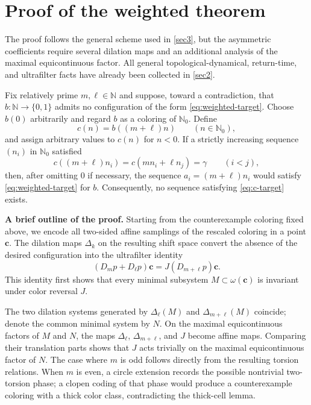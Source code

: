 \documentclass[reqno,12pt]{amsart}
\newcommand{\Nzero}{\mathbb N_0}
\def \N {\mathbb N}
\numberwithin{equation}{section}
\begin{document}
\section{Proof of the weighted theorem}\label{sec4}

The proof follows the general scheme used in \cref{sec3}, but the
asymmetric coefficients require several dilation maps and an additional
analysis of the maximal equicontinuous factor.  All general
topological-dynamical, return-time, and ultrafilter facts have already
been collected in \cref{sec2}.

Fix relatively prime $m,\ell\in\N$ and suppose, toward a contradiction, that
$b:\N\to\{0,1\}$ admits no configuration of the form
\eqref{eq:weighted-target}. Choose $b(0)$ arbitrarily and regard $b$ as a
coloring of $\Nzero$. Define
\[
 c(n)=b((m+\ell)n)\qquad(n\in\Nzero),
\]
and assign arbitrary values to $c(n)$ for $n<0$. If a strictly increasing
sequence $(n_i)$ in $\Nzero$ satisfied
\begin{equation}\label{eq:c-target}
 c((m+\ell)n_i)=c(mn_i+\ell n_j)=\gamma\qquad(i<j),
\end{equation}
then, after omitting $0$ if necessary, the sequence
$a_i=(m+\ell)n_i$ would satisfy \eqref{eq:weighted-target} for $b$.
Consequently, no sequence satisfying \eqref{eq:c-target} exists.

\noindent\textbf{A brief outline of the proof.}\enspace
Starting from the counterexample coloring fixed above, we encode all
two-sided affine samplings of the rescaled coloring
in a point $\mathbf c$.  The dilation maps $\Delta_k$ on the resulting
shift space convert the absence of the desired configuration into the
ultrafilter identity
\[
 (D_mp+D_\ell p)\mathbf c
 =J(D_{m+\ell}p)\mathbf c.
\]
This identity first shows that every minimal subsystem
$M\subset\omega(\mathbf c)$ is invariant under color reversal $J$.

The two dilation systems generated by $\Delta_\ell(M)$ and
$\Delta_{m+\ell}(M)$ coincide; denote the common minimal system by $N$.
On the maximal equicontinuous factors of $M$ and $N$, the maps
$\Delta_\ell$, $\Delta_{m+\ell}$, and $J$ become affine maps.  Comparing
their translation parts shows that $J$ acts trivially on the maximal
equicontinuous factor of $N$.  The case where $m$ is odd follows directly
from the resulting torsion relations.  When $m$ is even, a circle
extension records the possible nontrivial two-torsion phase; a clopen
coding of that phase would produce a counterexample coloring with a thick
color class, contradicting the thick-cell lemma.
\end{document}
